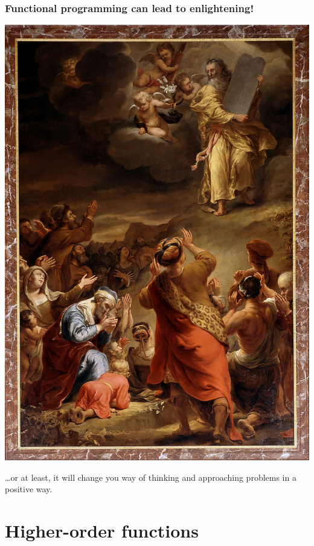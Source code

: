 \documentclass{beamer}
\begin{document}
\begin{frame}[containsverbatim]
  \frametitle{Functional programming can lead to enlightening!}

  \begin{center}
    \href{https://upload.wikimedia.org/wikipedia/commons/a/a7/Ferdinand_Bol_-_Moses_descends_from_Mount_Siniai_with_the_Ten_Commandments_-_Google_Art_Project.jpg}{%
      \includegraphics[height=0.7\textheight]{fig/bol}}
  \end{center}

  \ldots or at least, it will change you way of thinking and approaching problems in a positive way.
\end{frame}


\section{Higher-order functions}
\end{document}
